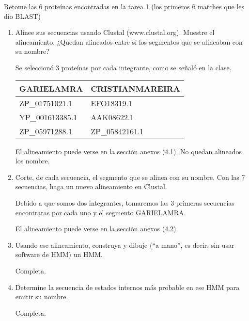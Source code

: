 Retome las 6 proteínas encontradas en la tarea 1 (los primeros 6 matches que les dio BLAST)

\begin{enumerate}
	\item Alinee sus secuencias usando Clustal (www.clustal.org). Muestre el alineamiento. ¿Quedan
		alineados entre sí los segmentos que se alineaban con su nombre?
	

		Se seleccionó 3 proteínas por cada integrante, como se señaló en la clase.

		\begin{tabular}{|l|l|}
			\hline
			GARIELAMRA & CRISTIANMAREIRA \\
			\hline
			ZP\_01751021.1 & EFO18319.1 \\ 
			YP\_001613385.1 & AAK08622.1 \\
			ZP\_05971288.1 & ZP\_05842161.1 \\
			\hline
		\end{tabular}

	El alineamiento puede verse en la sección anexos (4.1).	No quedan alineados los nombre.
			

	\item Corte, de cada secuencia, el segmento que se alinea con su nombre. Con las 7 secuencias,
		haga un nuevo alineamiento en Clustal.


		Debido a que somos dos integrantes, tomaremos las 3 primeras secuencias encontraras por cada uno y el segmento GARIELAMRA.

	El alineamiento puede verse en la sección anexos (4.2).

	\item Usando ese alineamiento, construya y dibuje (“a mano”, es decir, sin usar software de HMM)
		un HMM.


		 Completa.

	\item Determine la secuencia de estados internos más probable en ese HMM para emitir su
		nombre.


		 Completa.

\end{enumerate}
